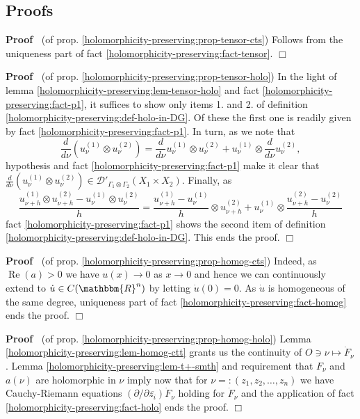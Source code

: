 \documentclass{article}
\newcommand{\nosymbol}{}
\newcommand{\tmop}[1]{\ensuremath{\operatorname{#1}}}
\newenvironment{proof}{\noindent\textbf{Proof\ }}{\hspace*{\fill}$\Box$\medskip}
\numberwithin{definition}{section}
\numberwithin{lemma}{section}
\numberwithin{proposition}{section}
{\theorembodyfont{\rmfamily}\newtheorem{remark}{Remark}
\numberwithin{remark}{section}
}
\begin{document}
\subsection{Proofs}

\begin{proof}
  (of prop. \ref{holomorphicity-preserving:prop-tensor-cts}) Follows from the
  uniqueness part of fact \ref{holomorphicity-preserving:fact-tensor}.
\end{proof}

\begin{proof}
  (of prop. \ref{holomorphicity-preserving:prop-tensor-holo}) In the light of
  lemma \ref{holomorphicity-preserving:lem-tensor-holo} and fact
  \ref{holomorphicity-preserving:fact-p1}, it suffices to show only items 1.
  and 2. of definition \ref{holomorphicity-preserving:def-holo-in-DG}. Of
  these the first one is readily given by fact
  \ref{holomorphicity-preserving:fact-p1}. In turn, as we note that
  \[ \frac{d}{d \nu} ( u_{\nu}^{( 1)} \otimes u_{\nu}^{( 2)}) = \frac{d}{d
     \nu} u_{\nu}^{( 1)} \otimes u_{\nu}^{( 2)} + u_{\nu}^{( 1)} \otimes
     \frac{d}{d \nu} u_{\nu}^{( 2)}, \]
  hypothesis and fact \ref{holomorphicity-preserving:fact-p1} make it clear
  that $\frac{d}{d \nu} ( u_{\nu}^{( 1)} \otimes u_{\nu}^{( 2)}) \in
  \mathcal{D}'_{\Gamma_1 \otimes \Gamma_2} ( X_1 \times X_{2 \nosymbol})$.
  Finally, as
  \[ \frac{u_{\nu + h}^{( 1)} \otimes u_{\nu + h}^{( 2)} - u_{\nu}^{( 1)}
     \otimes u_{\nu}^{( 2)}}{h} = \frac{u_{\nu + h}^{( 1)} - u_{\nu}^{(
     1)}}{h} \otimes u_{\nu + h}^{( 2)} + u_{\nu}^{( 1)} \otimes \frac{u_{\nu
     + h}^{( 2)} - u_{\nu}^{( 2)}}{h} \]
  fact \ref{holomorphicity-preserving:fact-p1} shows the second item of
  definition \ref{holomorphicity-preserving:def-holo-in-DG}. This ends the
  proof.
\end{proof}

\begin{proof}
  (of prop. \ref{holomorphicity-preserving:prop-homog-cts}) Indeed, as
  $\tmop{Re} ( a) > 0$ we have $u ( x) \rightarrow 0$ as $x \rightarrow 0$ and
  hence we can continuously extend to $\dot{u} \in C ( \mathbbm{R}^n)$ by
  letting $\dot{u} ( 0) = 0$. As $\dot{u}$ is homogeneous of the same degree,
  uniqueness part of fact \ref{holomorphicity-preserving:fact-homog} ends the
  proof.
\end{proof}

\begin{proof}
  (of prop. \ref{holomorphicity-preserving:prop-homog-holo}) Lemma
  \ref{holomorphicity-preserving:lem-homog-ctt} grants us the continuity of $O
  \ni \nu \mapsto \dot{F}_{\nu}$. Lemma
  \ref{holomorphicity-preserving:lem-t+-smth} and requirement that $F_{\nu}$
  and $a ( \nu)$ are holomorphic in $\nu$ imply now that for $\nu = : ( z_1,
  z_2, \ldots, z_n)$ we have Cauchy-Riemann equations $( \partial / \partial
  \overline{z_i}) \dot{F}_{\nu}$ holding for $\dot{F}_{\nu}$ and the
  application of fact \ref{holomorphicity-preserving:fact-holo} ends the
  proof.
\end{proof}
\end{document}

